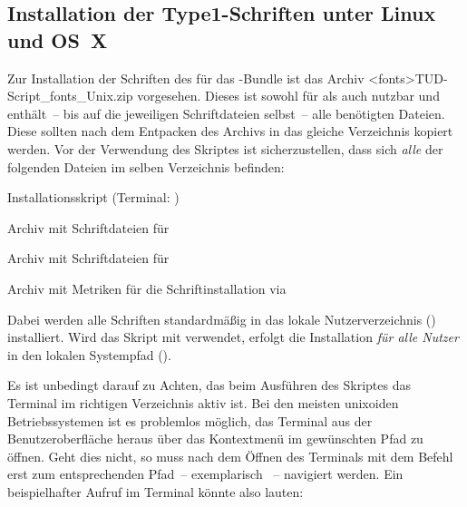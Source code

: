 \subsection{%
  Installation der Type1-Schriften unter Linux und OS~X%
  \label{sec:install:unix}%
}
%
Zur Installation der Schriften des \CDs für das \TUDScript-Bundle ist das 
Archiv \GitHubDownload*<fonts>{TUD-Script_fonts_Unix.zip} vorgesehen. Dieses 
ist sowohl für \TeXLive als auch \MacTeX nutzbar und enthält~-- bis auf die 
jeweiligen Schriftdateien selbst~-- alle benötigten Dateien. Diese sollten nach 
dem Entpacken des Archivs in das gleiche Verzeichnis kopiert werden. Vor der 
Verwendung des Skriptes  ist sicherzustellen, 
dass sich \emph{alle} der folgenden Dateien im selben Verzeichnis befinden:
%
\settowidth{}%
\begin{description}[labelwidth=\tudscrdim,labelsep=.5em]
  \item[\File*{tudscr_fonts_install.sh}]Installationsskript
    (Terminal: )
  \item[\File*{Univers_PS.zip}]Archiv mit Schriftdateien für \Univers
  \item[\File*{DIN_Bd_PS.zip}]Archiv mit Schriftdateien für \DIN
  \item[\File*{tudscr_fonts_install.zip}]Archiv mit Metriken für die
    Schriftinstallation via 
\end{description}
%
%
Dabei werden alle Schriften standardmäßig in das lokale Nutzerverzeichnis 
() installiert. Wird das Skript mit  verwendet, 
erfolgt die Installation \emph{für alle Nutzer} in den lokalen Systempfad 
().

Es ist unbedingt darauf zu Achten, das beim Ausführen des Skriptes das Terminal 
im richtigen Verzeichnis aktiv ist. Bei den meisten unixoiden Betriebssystemen 
ist es problemlos möglich, das Terminal aus der Benutzeroberfläche heraus über 
das Kontextmenü im gewünschten Pfad zu öffnen. Geht dies nicht, so muss nach 
dem Öffnen des Terminals mit dem Befehl  erst zum entsprechenden 
Pfad~-- exemplarisch ~-- 
navigiert werden. Ein beispielhafter Aufruf im Terminal könnte also lauten:
%
\begin{quoting}
\newline
{}
\end{quoting}



